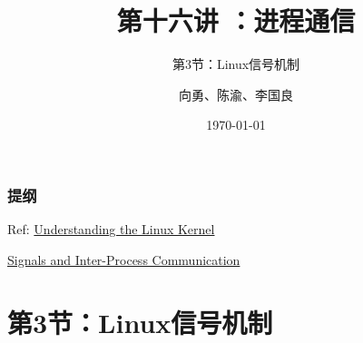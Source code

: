 


\title[第16讲]{第十六讲 ：进程通信} %
\subtitle{第3节：Linux信号机制}
\author{向勇、陈渝、李国良} %
\date{\today} %



\begin{frame}
\titlepage %
\end{frame}

\begin{frame}
\frametitle{提纲} %
\tableofcontents %

\pause

Ref: 
\href{http://ermak.cs.nstu.ru/understanding.linux.kernel.pdf }{Understanding the Linux Kernel}

\href{https://compas.cs.stonybrook.edu/~nhonarmand/courses/fa14/cse506.2/slides/ipc.pdf}{Signals and Inter-Process Communication}
\end{frame}
\section{第3节：Linux信号机制} %
